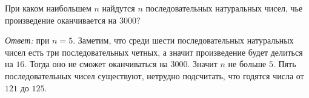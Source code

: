 При каком наибольшем $n$ найдутся $n$ последовательных натуральных чисел, чье
произведение оканчивается на $3000$?

\solution
\emph{Ответ:} при $n = 5$.
Заметим, что среди шести последовательных натуральных чисел есть три
последовательных четных, а значит произведение будет делиться на $16$.
Тогда оно не сможет оканчиваться на $3000$.
Значит $n$ не больше $5$.
Пять последовательных чисел существуют, нетрудно подсчитать, что годятся числа
от $121$ до $125$.
